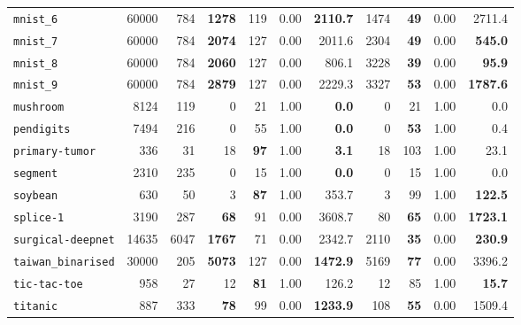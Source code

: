 \begin{tabular}{lccrrrrrrrr}
\texttt{mnist\_6} & \multicolumn{1}{r}{60000} & \multicolumn{1}{r}{784}  & \textbf{1278} & 119 & 0.00 & \textbf{2110.7} & 1474 & \textbf{49} & 0.00 & 2711.4\\
\texttt{mnist\_7} & \multicolumn{1}{r}{60000} & \multicolumn{1}{r}{784}  & \textbf{2074} & 127 & 0.00 & 2011.6 & 2304 & \textbf{49} & 0.00 & \textbf{545.0}\\
\texttt{mnist\_8} & \multicolumn{1}{r}{60000} & \multicolumn{1}{r}{784}  & \textbf{2060} & 127 & 0.00 & 806.1 & 3228 & \textbf{39} & 0.00 & \textbf{95.9}\\
\texttt{mnist\_9} & \multicolumn{1}{r}{60000} & \multicolumn{1}{r}{784}  & \textbf{2879} & 127 & 0.00 & 2229.3 & 3327 & \textbf{53} & 0.00 & \textbf{1787.6}\\
\texttt{mushroom} & \multicolumn{1}{r}{8124} & \multicolumn{1}{r}{119}  & 0 & 21 & 1.00 & \textbf{0.0} & 0 & 21 & 1.00 & 0.0\\
\texttt{pendigits} & \multicolumn{1}{r}{7494} & \multicolumn{1}{r}{216}  & 0 & 55 & 1.00 & \textbf{0.0} & 0 & \textbf{53} & 1.00 & 0.4\\
\texttt{primary-tumor} & \multicolumn{1}{r}{336} & \multicolumn{1}{r}{31}  & 18 & \textbf{97} & 1.00 & \textbf{3.1} & 18 & 103 & 1.00 & 23.1\\
\texttt{segment} & \multicolumn{1}{r}{2310} & \multicolumn{1}{r}{235}  & 0 & 15 & 1.00 & \textbf{0.0} & 0 & 15 & 1.00 & 0.0\\
\texttt{soybean} & \multicolumn{1}{r}{630} & \multicolumn{1}{r}{50}  & 3 & \textbf{87} & 1.00 & 353.7 & 3 & 99 & 1.00 & \textbf{122.5}\\
\texttt{splice-1} & \multicolumn{1}{r}{3190} & \multicolumn{1}{r}{287}  & \textbf{68} & 91 & 0.00 & 3608.7 & 80 & \textbf{65} & 0.00 & \textbf{1723.1}\\
\texttt{surgical-deepnet} & \multicolumn{1}{r}{14635} & \multicolumn{1}{r}{6047}  & \textbf{1767} & 71 & 0.00 & 2342.7 & 2110 & \textbf{35} & 0.00 & \textbf{230.9}\\
\texttt{taiwan\_binarised} & \multicolumn{1}{r}{30000} & \multicolumn{1}{r}{205}  & \textbf{5073} & 127 & 0.00 & \textbf{1472.9} & 5169 & \textbf{77} & 0.00 & 3396.2\\
\texttt{tic-tac-toe} & \multicolumn{1}{r}{958} & \multicolumn{1}{r}{27}  & 12 & \textbf{81} & 1.00 & 126.2 & 12 & 85 & 1.00 & \textbf{15.7}\\
\texttt{titanic} & \multicolumn{1}{r}{887} & \multicolumn{1}{r}{333}  & \textbf{78} & 99 & 0.00 & \textbf{1233.9} & 108 & \textbf{55} & 0.00 & 1509.4\\

\end{tabular}

